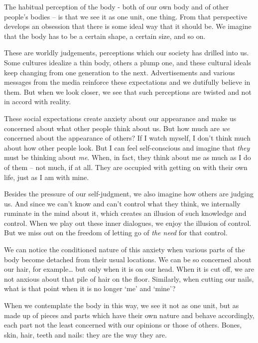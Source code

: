 The habitual perception of the body - both of our own body and of other
people's bodies -- is that we see it as one unit, one thing. From that
perspective develops an obsession that there is some ideal way that it
should be. We imagine that the body has to be a certain shape, a certain
size, and so on.

These are worldly judgements, perceptions which our society has drilled
into us. Some cultures idealize a thin body, others a plump one, and
these cultural ideals keep changing from one generation to the next.
Advertisements and various messages from the media reinforce these
expectations and we dutifully believe in them. But when we look closer,
we see that such perceptions are twisted and not in accord with reality.

These social expectations create anxiety about our appearance and make
us concerned about what other people think about us. But how much are
\emph{we} concerned about the appearance of others? If I watch myself, I
don't think much about how other people look. But I can feel
self-conscious and imagine that \emph{they} must be thinking about
\emph{me}. When, in fact, they think about me as much as I do of them --
not much, if at all. They are occupied with getting on with their own
life, just as I am with mine.

Besides the pressure of our self-judgment, we also imagine how others
are judging us. And since we can't know and can't control what they
think, we internally ruminate in the mind about it, which creates an
illusion of such knowledge and control. When we play out these inner
dialogues, we enjoy the illusion of control. But we miss out on the
freedom of letting go of \emph{the need} for that control.


We can notice the conditioned nature of this anxiety when various parts
of the body become detached from their usual locations. We can be so
concerned about our hair, for example\ldots{} but only when it is on our
head. When it is cut off, we are not anxious about that pile of hair on
the floor. Similarly, when cutting our nails, what is that point when it
is no longer `me' and `mine'?

When we contemplate the body in this way, we see it not as one unit, but
as made up of pieces and parts which have their own nature and behave
accordingly, each part not the least concerned with our opinions or
those of others. Bones, skin, hair, teeth and nails: they are the way
they are.


